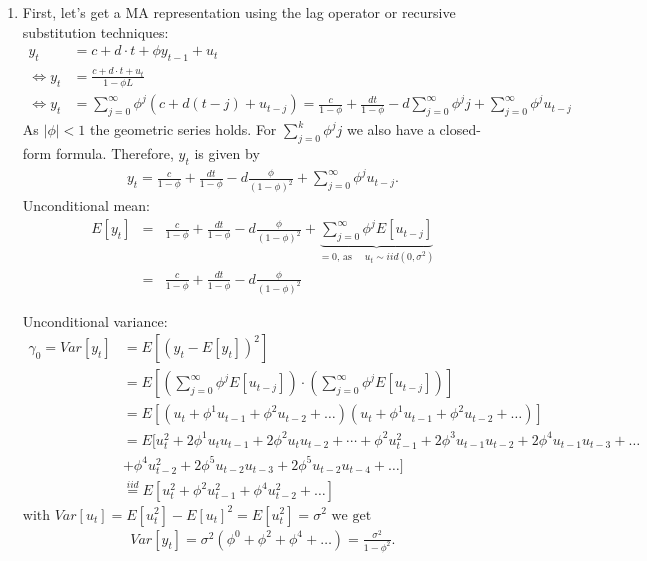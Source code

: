 \begin{enumerate}
\item First, let's get a MA representation using the lag operator or recursive substitution techniques:
\begin{align*}
y_t &= c + d\cdot t + \phi y_{t-1} + u_t\\
\Leftrightarrow y_t &= \frac{c + d\cdot t + u_t}{1-\phi L}\\
\Leftrightarrow y_t &= \sum_{j=0}^{\infty}\phi^j(c+d(t-j)+u_{t-j}) = \frac{c}{1-\phi} + \frac{dt}{1-\phi} - d\sum_{j=0}^{\infty}\phi^j j + \sum_{j=0}^{\infty}\phi^j u_{t-j}
\end{align*}
As \( |\phi|<1 \) the geometric series holds.
For \(\sum_{j=0}^{k} \phi^j j\) we also have a closed-form formula.
Therefore, \(y_{t}\) is given by
\begin{align*}
y_{t} = \frac{c}{1-\phi} + \frac{dt}{1-\phi} - d \frac{\phi}{{(1-\phi)}^2}  + \sum_{j=0}^{\infty} \phi^j u_{t-j}.
\end{align*} 
Unconditional mean:
\begin{align*}
E[y_{t}] &=& \frac{c}{1-\phi} + \frac{dt}{1-\phi} - d \frac{\phi}{{(1-\phi)}^2} + \underbrace{\sum_{j=0}^{\infty} \phi^j E[u_{t-j}]}_{=0 \text{,~as~}\quad u_{t} \sim iid(0, \sigma^2)} \\
&=& \frac{c}{1-\phi} + \frac{dt}{1-\phi} - d \frac{\phi}{{(1-\phi)}^2}
\end{align*}	

Unconditional variance:
\begin{align*}
\gamma_0 = Var[y_{t}]
&= E[(y_{t} - E[y_{t}])^2 ] \\
&= E[(\sum_{j=0}^{\infty} \phi^j E[u_{t-j}]) \cdot (\sum_{j=0}^{\infty} \phi^j E[u_{t-j}])] \\
&= E[(u_{t} + \phi^1 u_{t-1} + \phi^2 u_{t-2} + \dots)(u_{t} + \phi^1 u_{t-1} + \phi^2 u_{t-2} + \dots)] \\
&= E[	u_{t}^2 + 2\phi^1 u_{t}u_{t-1} + 2\phi^2 u_{t}u_{t-2} + \cdots + 
\phi^2 u_{t-1}^2 + 2\phi^3 u_{t-1}u_{t-2} + 2\phi^4 u_{t-1}u_{t-3} + \dots  \\
&+ \phi^4 u_{t-2}^2 + 2\phi^5 u_{t-2}u_{t-3} + 2\phi^5 u_{t-2}u_{t-4} + \dots ] \\
&\overset{iid}{=} E [ u_{t}^2+ \phi^2 u_{t-1}^2 + \phi^4 u_{t-2}^2 + \dots ]
\end{align*}
\(\text{with } Var[u_{t}] = E[u_{t}^2] - E[u_{t}]^2 = E[u_{t}^2] = \sigma^2 \text{ we get}\)
\begin{align*}
Var[y_{t}] = \sigma^2 ( \phi^0 + \phi^2 + \phi^4 + \dots ) = \frac{\sigma^2}{1-\phi^2}.
\end{align*}


\end{enumerate}
